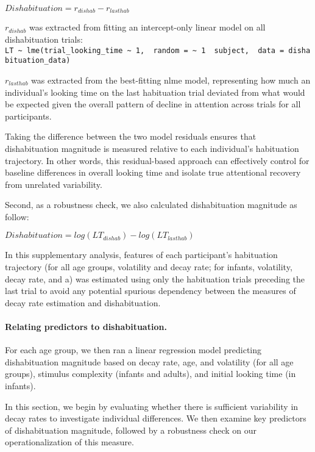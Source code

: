 \documentclass[10pt, letterpaper]{article}
\begin{document}
\(Dishabituation = r_{dishab} - r_{lasthab}\)

\(r_{dishab}\) was extracted from fitting an intercept-only linear model
on all dishabituation trials:
\texttt{LT\ \textasciitilde{}\ lme(trial\_looking\_time\ \textasciitilde{}\ 1,\ \ random\ =\ \textasciitilde{}\ 1\ \textbar{}\ subject,\ \ data\ =\ dishabituation\_data)}

\(r_{lasthab}\) was extracted from the best-fitting nlme model,
representing how much an individual's looking time on the last
habituation trial deviated from what would be expected given the overall
pattern of decline in attention across trials for all participants.

Taking the difference between the two model residuals ensures that
dishabituation magnitude is measured relative to each individual's
habituation trajectory. In other words, this residual-based approach can
effectively control for baseline differences in overall looking time and
isolate true attentional recovery from unrelated variability.

Second, as a robustness check, we also calculated dishabituation
magnitude as follow:

\(Dishabituation = log(LT_{dishab}) - log(LT_{lasthab})\)

In this supplementary analysis, features of each participant's
habituation trajectory (for all age groups, volatility and decay rate;
for infants, volatility, decay rate, and a) was estimated using only the
habituation trials preceding the last trial to avoid any potential
spurious dependency between the measures of decay rate estimation and
dishabituation.

\hypertarget{relating-predictors-to-dishabituation.}{%
\paragraph{Relating predictors to
dishabituation.}\label{relating-predictors-to-dishabituation.}}

For each age group, we then ran a linear regression model predicting
dishabituation magnitude based on decay rate, age, and volatility (for
all age groups), stimulus complexity (infants and adults), and initial
looking time (in infants).

In this section, we begin by evaluating whether there is sufficient
variability in decay rates to investigate individual differences. We
then examine key predictors of dishabituation magnitude, followed by a
robustness check on our operationalization of this measure.
\end{document}
